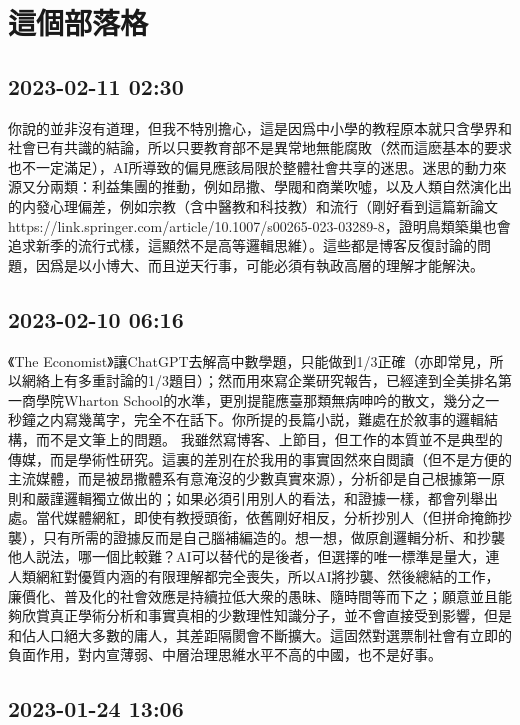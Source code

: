 \documentclass[twocolumn]{ctexart}
\begin{document}
\section*{這個部落格}
\subsection*{2023-02-11 02:30}

你說的並非沒有道理，但我不特別擔心，這是因爲中小學的教程原本就只含學界和社會已有共識的結論，所以只要教育部不是異常地無能腐敗（然而這麽基本的要求也不一定滿足），AI所導致的偏見應該局限於整體社會共享的迷思。迷思的動力來源又分兩類：利益集團的推動，例如昂撒、學閥和商業吹噓，以及人類自然演化出的内發心理偏差，例如宗教（含中醫教和科技教）和流行（剛好看到這篇新論文https://link.springer.com/article/10.1007/s00265-023-03289-8，證明鳥類築巢也會追求新季的流行式樣，這顯然不是高等邏輯思維）。這些都是博客反復討論的問題，因爲是以小博大、而且逆天行事，可能必須有執政高層的理解才能解決。
\subsection*{2023-02-10 06:16}

《The Economist》讓ChatGPT去解高中數學題，只能做到1/3正確（亦即常見，所以網絡上有多重討論的1/3題目）；然而用來寫企業研究報告，已經達到全美排名第一商學院Wharton School的水準，更別提龍應臺那類無病呻吟的散文，幾分之一秒鐘之内寫幾萬字，完全不在話下。你所提的長篇小説，難處在於敘事的邏輯結構，而不是文筆上的問題。
我雖然寫博客、上節目，但工作的本質並不是典型的傳媒，而是學術性研究。這裏的差別在於我用的事實固然來自閲讀（但不是方便的主流媒體，而是被昂撒體系有意淹沒的少數真實來源），分析卻是自己根據第一原則和嚴謹邏輯獨立做出的；如果必須引用別人的看法，和證據一樣，都會列舉出處。當代媒體網紅，即使有教授頭銜，依舊剛好相反，分析抄別人（但拼命掩飾抄襲），只有所需的證據反而是自己腦補編造的。想一想，做原創邏輯分析、和抄襲他人説法，哪一個比較難？AI可以替代的是後者，但選擇的唯一標準是量大，連人類網紅對優質内涵的有限理解都完全喪失，所以AI將抄襲、然後總結的工作，廉價化、普及化的社會效應是持續拉低大衆的愚昧、隨時間等而下之；願意並且能夠欣賞真正學術分析和事實真相的少數理性知識分子，並不會直接受到影響，但是和佔人口絕大多數的庸人，其差距隔閡會不斷擴大。這固然對選票制社會有立即的負面作用，對内宣薄弱、中層治理思維水平不高的中國，也不是好事。
\subsection*{2023-01-24 13:06}
\end{document}
